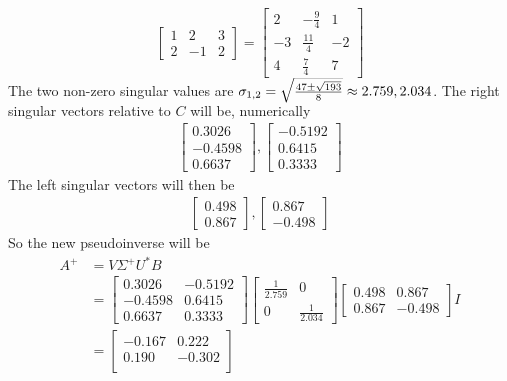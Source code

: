 \begin{Answer}
\begin{align*}
\begin{bmatrix}
1 & 2 & 3 \\
2 & -1 & 2
\end{bmatrix}
= \begin{bmatrix}
2&-\frac{9}{4}&1\\ 
-3&\frac{11}{4}&-2\\ 
4&\frac{7}{4}&7
\end{bmatrix}
\end{align*}
The two non-zero singular values are $\sigma_{1,2} = \smash{\sqrt{\frac{47\pm\sqrt{193}}{8}}} \approx 2.759, 2.034$. The right singular vectors relative to $C$ will be, numerically
\begin{align*}
\begin{bmatrix}
0.3026 \\
-0.4598 \\
0.6637
\end{bmatrix},
\begin{bmatrix}
-0.5192 \\
0.6415 \\
0.3333
\end{bmatrix}
\end{align*}
The left singular vectors will then be
\begin{align*}
\begin{bmatrix}
0.498 \\
0.867
\end{bmatrix},
\begin{bmatrix}
0.867 \\
-0.498
\end{bmatrix}
\end{align*}
So the new pseudoinverse will be
\begin{align*}
A^+ &= V \Sigma^+ U^* B \\
&= \begin{bmatrix}
0.3026 & -0.5192 \\
-0.4598 & 0.6415 \\
0.6637 & 0.3333
\end{bmatrix}
\begin{bmatrix}
\frac{1}{2.759} & 0 \\
0 & \frac{1}{2.034}
\end{bmatrix}
\begin{bmatrix}
0.498 & 0.867 \\
0.867 & -0.498
\end{bmatrix} I \\
&=
\begin{bmatrix}
-0.167 & 0.222 \\
0.190 & -0.302 \\

\end{bmatrix}
\end{align*}
\end{Answer}
